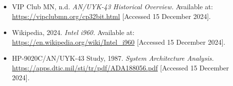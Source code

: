 \documentclass{article}
\begin{document}
\begin{itemize}
\item VIP Club MN, n.d. \textit{AN/UYK-43 Historical Overview.} Available at: \url{https://vipclubmn.org/cp32bit.html} [Accessed 15 December 2024].

\item Wikipedia, 2024. \textit{Intel i960.} Available at: \url{https://en.wikipedia.org/wiki/Intel_i960} [Accessed 15 December 2024].

\item HP-9020C/AN/UYK-43 Study, 1987. \textit{System Architecture Analysis.} \url{https://apps.dtic.mil/sti/tr/pdf/ADA188056.pdf} [Accessed 15 December 2024].

\end{itemize}
\end{document}
